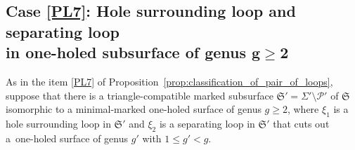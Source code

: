 \documentclass[10pt,a4paper]{amsart}
\numberwithin{equation}{section}
\theoremstyle{definition}
\begin{document}
\subsection[Case \ref{PL7}: Hole surrounding loop and separating loop in one-holed subsurface of genus g>= 2]{Case \ref{PL7}: Hole surrounding loop and separating loop\\ in one-holed subsurface of genus $\boldsymbol{g\ge 2}$}
As in the item \ref{PL7} of Proposition~\ref{prop:classification_of_pair_of_loops}, suppose that there is a triangle-compatible marked subsurface $\mathfrak{S}'=\Sigma'\setminus\mathcal{P}'$ of $\mathfrak{S}$ isomorphic to a minimal-marked one-holed surface of genus $g\ge 2$, where $\xi_1$ is a hole surrounding loop in $\mathfrak{S}'$ and $\xi_2$ is a separating loop in $\mathfrak{S'}$ that cuts out a~one-holed surface of genus $g'$ with $1\le g'<g$.
\end{document}
